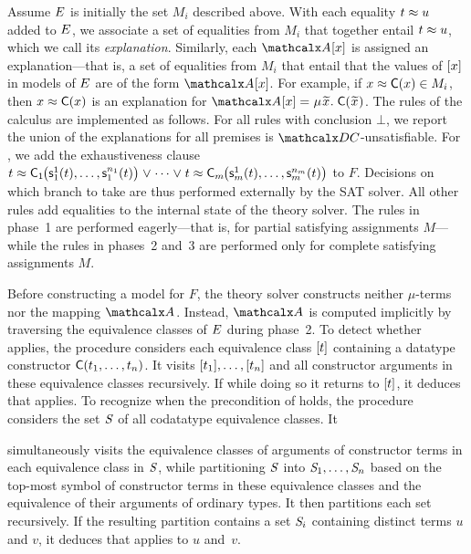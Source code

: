 Assume $E$ is initially the set $M_i$ described above. With each equality $t \approx u$ added
to $E$, we associate a set of equalities from $M_i$ that together entail $t
\approx u$, which we call its \emph{explanation}.
Similarly, each $\Val \ec{x}$ is assigned an explanation---that is, a set
of equalities from $M_i$ that entail that the values of $[x]$ in models of
$E$ are of the form $\Val \ec{x}$. For example, if $x \approx \textsf{C}( x ) \in
M_i$, then $x \approx \textsf{C}( x )$ is an %
explanation for $\Val \ec{x} = \MU {\Varec{x}}.\; \const{C}( {\Varec{x}} )$.
The rules of the calculus are implemented as follows. For all rules with
conclusion $\bot$, we report the union of the explanations for all premises is
$\thD$-unsatisfiable. For , we add the exhaustiveness clause %
$t \approx \textsf{C}_{1}\kern-0.083333em\bigl(\textsf{s}^1_{1}( t ), \ldots,\textsf{s}^{n_{1}}_{1}( t )\bigr) \mathrel\lor \cdots \mathrel\lor t \approx \textsf{C}_{m}\kern-0.083333em\bigl(\textsf{s}^1_{m}( t ), \ldots,\textsf{s}^{n_{m}}_{m}( t )\bigr)$ to $F$.
Decisions on which branch to take are thus performed externally by the SAT
solver. %
All other rules add equalities to the
internal state of the theory solver. The rules in phase~1 are performed
eagerly---that is, for partial satisfying assignments $M$---while the rules in
phases~2 and~3 are performed only for complete satisfying
assignments $M$.

Before constructing a model for $F\!$, the theory solver constructs neither $\mu$-terms nor the mapping $\Val$.
Instead, $\Val$ is computed implicitly by traversing the equivalence classes of $E$ during phase~2.
To detect whether  applies,
the procedure considers each equivalence class $[t]$ containing a datatype constructor $\textsf{C}( t_1, \ldots, t_n )$.
It visits $[t_1], \ldots, [t_n]$ and all constructor arguments in these equivalence classes recursively.
If while doing so it returns to $[t]$, it deduces that  applies. %
To recognize when the precondition of  holds,
the procedure considers the set $\mathit{S}$ of all codatatype equivalence classes. It
\begin{conf}\goodbreak\noindent\end{conf}%
simultaneously visits the equivalence classes of arguments of constructor terms in each equivalence class in $\mathit{S}$,
while partitioning $\mathit{S}$ into $\mathit{S}_1, \ldots, \mathit{S}_n$ based on the top-most symbol of constructor terms in these equivalence classes
and the equivalence of their arguments of ordinary types.
It then partitions each set %
recursively.
If %
the resulting partition contains a set $\mathit{S}_i$ containing distinct terms $u$
and $v$, it deduces that  applies to $u$ and~$v$.

